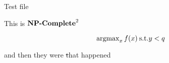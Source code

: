 \documentclass[12pt]{article}
\begin{document}
Test file

This is \({{\textbf{NP-Complete}}}^2\)


\[
  \operatorname{argmax}_x f(x) \: \text{s.t.} y < q
\]



and then they were \st that happened

\end{document}
